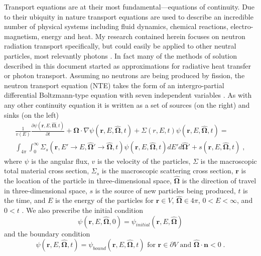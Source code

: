 Transport equations are at their most fundamental---equations of continuity.
Due to their ubiquity in nature transport equations are used to describe an incredible number of physical systems including fluid dynamics, chemical reactions, electro-magnetism, energy and heat.
My research contained herein focuses on neutron radiation transport specifically, but could easily be applied to other neutral particles, most relevantly photons \cite{radheattrans2003, chandrasekhar1960radiative}.
In fact many of the methods of solution described in this document started as approximations for radiative heat transfer or photon transport.
Assuming no neutrons are being produced by fission, the neutron transport equation (NTE) takes the form of an intergro-partial differential Boltzmann-type equation with seven independent variables \cite{duderstadt_hamilton}.
As with any other continuity equation it is written as a set of sources (on the right) and sinks (on the left)
\begin{multline}
    \label{eq:fullNTE}
    \frac{1}{v(E)}\frac{\partial \psi(\boldsymbol{r}, E, \boldsymbol{\hat{\Omega}},t)}{\partial t} + \boldsymbol{\hat{\Omega}} \cdot \nabla \psi(\boldsymbol{r}, E, \boldsymbol{\hat{\Omega}},t) + \Sigma(r, E, t) \psi(\boldsymbol{r}, E, \boldsymbol{\hat{\Omega}},t) = \\
    \int_{4\pi}\int_{0}^{\infty}\Sigma_s(\boldsymbol{r}, E'\rightarrow E, \boldsymbol{\hat{\Omega}'} \rightarrow \boldsymbol{\hat{\Omega}}, t)
    \psi(\boldsymbol{r}, E, \boldsymbol{\hat{\Omega}},t) dE' d\boldsymbol{\hat{\Omega}'} +
    s(\boldsymbol{r}, E, \boldsymbol{\hat{\Omega}},t) \;,
\end{multline}
where $\psi$ is the angular flux, $v$ is the velocity of the particles, $\Sigma$ is the macroscopic total material cross section, $\Sigma_s$ is the macroscopic scattering cross section, $\boldsymbol{r}$ is the location of the particle in three-dimensional space, $\boldsymbol{\hat{\Omega}}$ is the direction of travel in three-dimensional space, $s$ is the source of new particles being produced, $t$ is the time, and $E$ is the energy of the particles for $\boldsymbol{r} \in V$, $\boldsymbol{\hat{\Omega}} \in 4\pi$, $0<E<\infty$, and $0<t$ \cite{duderstadt_hamilton}. We also prescribe the initial condition
\begin{equation}
    \psi(\boldsymbol{r}, E, \boldsymbol{\hat{\Omega}},0) = \psi_{initial}(\boldsymbol{r}, E, \boldsymbol{\hat{\Omega}})
\end{equation}
and the boundary condition
\begin{equation}
    \psi(\boldsymbol{r}, E, \boldsymbol{\hat{\Omega}},t) = \psi_{bound}(\boldsymbol{r}, E, \boldsymbol{\hat{\Omega}},t) \text{ for } \boldsymbol{r} \in \partial V \text{ and } \boldsymbol{\hat{\Omega}} \cdot \boldsymbol{n} < 0 \;.
\end{equation}
